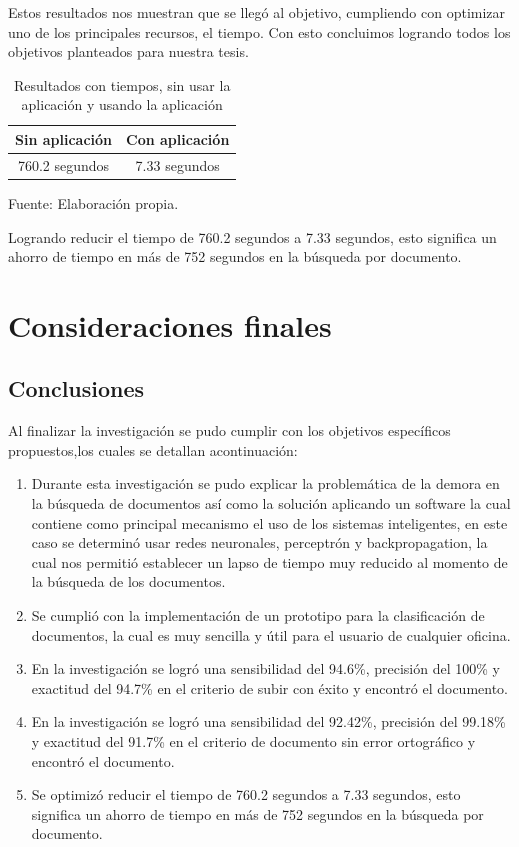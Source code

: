 Estos resultados nos muestran que se llegó al objetivo, cumpliendo con optimizar uno de los principales recursos, el tiempo. Con esto concluimos logrando todos los objetivos planteados para nuestra tesis.

\begin{table}[h!]
\centering
\caption{Resultados con tiempos, sin usar la aplicación y usando la aplicación}
\label{tab:my-table}
\begin{tabular}{|c|c|}
\hline
\rowcolor[HTML]{2E9AFE} 
{\color[HTML]{FFFFFF} \textbf{Sin aplicación}} & {\color[HTML]{FFFFFF} \textbf{Con aplicación}} \\ \hline
\rowcolor[HTML]{81DAF5} 
760.2 segundos                                  & 7.33 segundos                                  \\ \hline
\end{tabular}
\begin{center}
Fuente: Elaboración propia.
\end{center}
\end{table}
\newpage
Logrando reducir el tiempo de 760.2 segundos a 7.33 segundos, esto significa un ahorro de tiempo en más de 752 segundos en la búsqueda por documento.



\newpage


\chapter{Consideraciones finales}


\section{Conclusiones}

Al finalizar la investigación se pudo cumplir con los objetivos específicos propuestos,los cuales se detallan acontinuación:
\begin{enumerate}
\item Durante esta investigación se pudo explicar la problemática de la demora en la búsqueda de documentos así como la solución aplicando un software la cual contiene como principal mecanismo el uso de los sistemas inteligentes, en este caso se determinó usar redes neuronales, perceptrón y backpropagation, la cual nos permitió establecer un lapso de tiempo muy reducido al momento de la búsqueda de los documentos.
\item Se cumplió con la implementación de un prototipo para la clasificación de documentos, la cual es muy sencilla y útil para el usuario de cualquier oficina.
\item En la investigación se logró una sensibilidad del 94.6\%, precisión del 100\% y exactitud del 94.7\% en el criterio de subir con éxito y encontró el documento.
\item  En la investigación se logró una sensibilidad del 92.42\%, precisión del 99.18\% y exactitud del 91.7\% en el criterio de documento sin error ortográfico y encontró el documento.
\item Se optimizó reducir el tiempo de 760.2 segundos a 7.33 segundos, esto significa un ahorro de tiempo en más de 752 segundos en la búsqueda por documento.
\end{enumerate}

